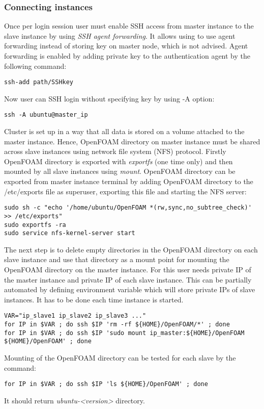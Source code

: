 \documentclass[11pt,english]{article}
\begin{document}
\subsubsection{Connecting instances}
Once per login session user must enable SSH access from master instance to the slave instance by using \textit{SSH agent forwarding}. It allows using to use agent forwarding instead of storing key on master node, which is not advised. Agent forwarding is enabled by adding private key to the authentication agent by the following command:
\begin{lstlisting}
ssh-add path/SSHkey
\end{lstlisting}
Now user can SSH login without specifying key by using -A option:
\begin{lstlisting}
ssh -A ubuntu@master_ip
\end{lstlisting}
Cluster is set up in a way that all data is stored on a volume attached to the master instance. Hence, OpenFOAM directory on master instance must be shared across slave instances using network file system (NFS) protocol. Firstly OpenFOAM directory is exported with \textit{exportfs} (one time only) and then mounted by all slave instances using \textit{mount}.
OpenFOAM directory can be exported from master instance terminal by adding OpenFOAM directory to the /etc/exports file as superuser, exporting this file and starting the NFS server:
\begin{lstlisting}
sudo sh -c "echo '/home/ubuntu/OpenFOAM *(rw,sync,no_subtree_check)' >> /etc/exports"
sudo exportfs -ra
sudo service nfs-kernel-server start
\end{lstlisting}
The next step is to delete empty directories in the OpenFOAM directory on each slave instance and use that directory as a mount point for mounting the OpenFOAM directory on the master instance. For this user needs private IP of the master instance and private IP of each slave instance. This can be partially automated by defining environment variable which will store private IPs of slave instances. It has to be done each time instance is started.
\begin{lstlisting}
VAR="ip_slave1 ip_slave2 ip_slave3 ..."
for IP in $VAR ; do ssh $IP 'rm -rf ${HOME}/OpenFOAM/*' ; done
for IP in $VAR ; do ssh $IP 'sudo mount ip_master:${HOME}/OpenFOAM ${HOME}/OpenFOAM' ; done
\end{lstlisting}
Mounting of the OpenFOAM directory can be tested for each slave by the command:
\begin{lstlisting}
for IP in $VAR ; do ssh $IP 'ls ${HOME}/OpenFOAM' ; done
\end{lstlisting}
It should return \textit{ubuntu-<version>} directory.
\end{document}
